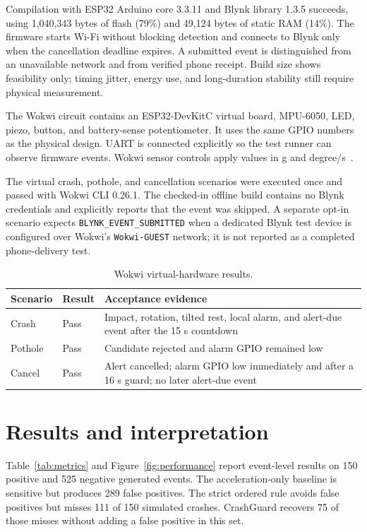 \documentclass[12pt,a4paper]{article}
\begin{document}
Compilation with ESP32 Arduino core 3.3.11 and Blynk library 1.3.5 succeeds,
using 1,040,343 bytes of flash (79\%) and 49,124 bytes of static RAM (14\%).
The firmware starts Wi-Fi without blocking detection and connects to Blynk
only when the cancellation deadline expires. A submitted event is distinguished
from an unavailable network and from verified phone receipt. Build size shows
feasibility only; timing jitter, energy use, and long-duration stability still
require physical measurement.

The Wokwi circuit contains an ESP32-DevKitC virtual board, MPU-6050, LED,
piezo, button, and battery-sense potentiometer. It uses the same GPIO numbers
as the physical design. UART is connected explicitly so the
test runner can observe firmware events. Wokwi sensor controls apply values in
g and degree/s~\cite{wokwidiagram,wokwimpu,wokwiscenarios}.

The virtual crash, pothole, and cancellation scenarios were executed once and
passed with Wokwi CLI 0.26.1. The checked-in offline build contains no Blynk
credentials and explicitly reports that the event was skipped. A separate
opt-in scenario expects \texttt{BLYNK\_EVENT\_SUBMITTED} when a dedicated Blynk
test device is configured over Wokwi's \texttt{Wokwi-GUEST} network; it is not
reported as a completed phone-delivery test.

\begin{table}[H]
\centering
\small
\caption{Wokwi virtual-hardware results.}
\begin{tabularx}{\textwidth}{@{}p{}p{}X@{}}
\toprule
Scenario & Result & Acceptance evidence \\
\midrule
Crash & Pass & Impact, rotation, tilted rest, local alarm, and alert-due event
after the 15 s countdown \\
Pothole & Pass & Candidate rejected and alarm GPIO remained low \\
Cancel & Pass & Alert cancelled; alarm GPIO low immediately and after a 16 s
guard; no later alert-due event \\
\bottomrule
\end{tabularx}
\end{table}

\section{Results and interpretation}

Table~\ref{tab:metrics} and Figure~\ref{fig:performance} report event-level
results on 150 positive and 525 negative generated events. The
acceleration-only baseline is sensitive but produces 289 false positives. The
strict ordered rule avoids false positives but misses 111 of 150 simulated
crashes. CrashGuard recovers 75 of those misses without adding a false positive
in this set.
\end{document}
